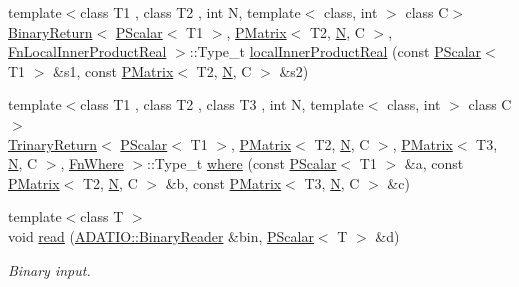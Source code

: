 \begin{DoxyCompactItemize}
\item 
{\footnotesize template$<$class T1 , class T2 , int N, template$<$ class, int $>$ class C$>$ }\\\mbox{\hyperlink{structENSEM_1_1BinaryReturn}{Binary\+Return}}$<$ \mbox{\hyperlink{classENSEM_1_1PScalar}{P\+Scalar}}$<$ T1 $>$, \mbox{\hyperlink{classENSEM_1_1PMatrix}{P\+Matrix}}$<$ T2, \mbox{\hyperlink{operator__name__util_8cc_a7722c8ecbb62d99aee7ce68b1752f337}{N}}, C $>$, \mbox{\hyperlink{structENSEM_1_1FnLocalInnerProductReal}{Fn\+Local\+Inner\+Product\+Real}} $>$\+::Type\+\_\+t \mbox{\hyperlink{group__primmatrix_ga8a2b85a888121b8b0ff46870c7705474}{local\+Inner\+Product\+Real}} (const \mbox{\hyperlink{classENSEM_1_1PScalar}{P\+Scalar}}$<$ T1 $>$ \&s1, const \mbox{\hyperlink{classENSEM_1_1PMatrix}{P\+Matrix}}$<$ T2, \mbox{\hyperlink{operator__name__util_8cc_a7722c8ecbb62d99aee7ce68b1752f337}{N}}, C $>$ \&s2)
\item 
{\footnotesize template$<$class T1 , class T2 , class T3 , int N, template$<$ class, int $>$ class C$>$ }\\\mbox{\hyperlink{structENSEM_1_1TrinaryReturn}{Trinary\+Return}}$<$ \mbox{\hyperlink{classENSEM_1_1PScalar}{P\+Scalar}}$<$ T1 $>$, \mbox{\hyperlink{classENSEM_1_1PMatrix}{P\+Matrix}}$<$ T2, \mbox{\hyperlink{operator__name__util_8cc_a7722c8ecbb62d99aee7ce68b1752f337}{N}}, C $>$, \mbox{\hyperlink{classENSEM_1_1PMatrix}{P\+Matrix}}$<$ T3, \mbox{\hyperlink{operator__name__util_8cc_a7722c8ecbb62d99aee7ce68b1752f337}{N}}, C $>$, \mbox{\hyperlink{structENSEM_1_1FnWhere}{Fn\+Where}} $>$\+::Type\+\_\+t \mbox{\hyperlink{group__primmatrix_gacb8fae3141957f56989969c3cb8f694e}{where}} (const \mbox{\hyperlink{classENSEM_1_1PScalar}{P\+Scalar}}$<$ T1 $>$ \&a, const \mbox{\hyperlink{classENSEM_1_1PMatrix}{P\+Matrix}}$<$ T2, \mbox{\hyperlink{operator__name__util_8cc_a7722c8ecbb62d99aee7ce68b1752f337}{N}}, C $>$ \&b, const \mbox{\hyperlink{classENSEM_1_1PMatrix}{P\+Matrix}}$<$ T3, \mbox{\hyperlink{operator__name__util_8cc_a7722c8ecbb62d99aee7ce68b1752f337}{N}}, C $>$ \&c)
\item 
{\footnotesize template$<$class T $>$ }\\void \mbox{\hyperlink{group__primscalar_ga1d9173117dec6193e9c26c211973310b}{read}} (\mbox{\hyperlink{classADATIO_1_1BinaryReader}{A\+D\+A\+T\+I\+O\+::\+Binary\+Reader}} \&bin, \mbox{\hyperlink{classENSEM_1_1PScalar}{P\+Scalar}}$<$ T $>$ \&d)
\begin{DoxyCompactList}\small\item\em Binary input. \end{DoxyCompactList}\item 

\end{DoxyCompactItemize}
